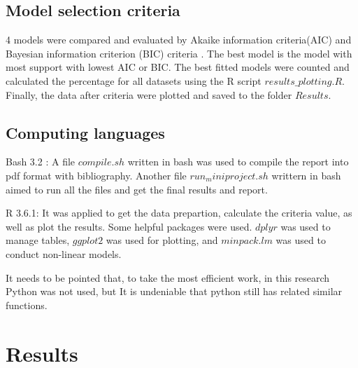 \documentclass[11pt]{article}
\begin{document}
\subsection{Model selection criteria}
4  models were compared and evaluated by Akaike information criteria(AIC) \citep{R17} and Bayesian information criterion (BIC) criteria \citep{R18}. The best model is the model with most support with lowest AIC or BIC. The best fitted models were counted and calculated the percentage for all datasets using the R script $results\_plotting.R$. Finally,  the data after criteria were plotted and saved to the folder $Results$.

\subsection{Computing languages}
Bash 3.2 : A file $compile.sh$ written in bash was used to compile the report into pdf format with bibliography. Another file $run_miniproject.sh$ writtern in bash aimed to run all the files and get the final results and report.

R 3.6.1: It was applied to get the data prepartion, calculate the criteria value, as well as plot the results. Some helpful packages were used. $dplyr$ was used to manage tables, $ggplot2$ was used for plotting, and $minpack.lm$ was used to conduct non-linear models. 

It needs to be pointed that, to take the most efficient work, in this research Python was not used, but It is undeniable that python still has related similar functions.

\section{Results}
\end{document}
